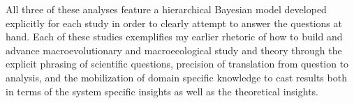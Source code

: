 All three of these analyses feature a hierarchical Bayesian model developed explicitly for each study in order to clearly attempt to answer the questions at hand. Each of these studies exemplifies my earlier rhetoric of how to build and advance macroevolutionary and macroecological study and theory through the explicit phrasing of scientific questions, precision of translation from question to analysis, and the mobilization of domain specific knowledge to cast results both in terms of the system specific insights as well as the theoretical insights.
